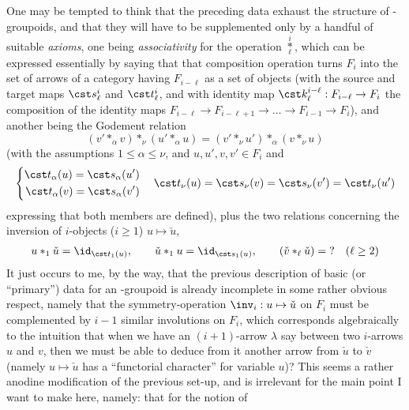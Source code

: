 One may be tempted to think that the preceding data exhaust the
structure of \oo-groupoids, and that they will have to be supplemented
only by a handful of suitable \emph{axioms}, one being
\emph{associativity} for the operation
$\overset{i}{\underset{\ell}{*}}$, which can be expressed essentially
by saying that that composition operation turns $F_i$ into the set of
arrows of a category having $F_{i-\ell}$ as a set of objects (with the
source and target maps $\cst s_\ell^i$ and $\cst t_\ell^i$, and with
identity map $\cst k_\ell^{i-\ell} : F_{i-\ell} \to F_i$ the
composition of the identity maps $F_{i-\ell} \to F_{i-\ell+1} \to
\dots \to F_{i-1} \to F_i$), and another being the Godement relation
\begin{equation*}
  (v' *_\alpha v) *_\nu (u' *_\alpha u) = (v' *_\nu u') *_\alpha (v
  *_\nu u)
\end{equation*}
(with the assumptions $1\le\alpha\le\nu$, and $u,u',v,v' \in F_i$ and
\begin{equation*}
  \left\{\begin{aligned}
      \cst t_\alpha(u)=\cst s_\alpha(u') \\
      \cst t_\alpha(v)=\cst s_\alpha(v') \\
    \end{aligned}\right.\quad
  \cst t_\nu(u) = \cst s_\nu(v) = \cst s_\nu(v') = \cst t_\nu(u')
\end{equation*}
expressing that both members are defined), plus the two relations
concerning the inversion of $i$-objects ($i\ge1$) $u \mapsto \check
u$,
\begin{multline*}
  u *_1 \check u = \id_{\cst t_1(u)} , \qquad \check u *_1 u =
  \id_{\cst s_1(u)} , \qquad
  (\check v *_\ell \check u) = \text{?} \quad(\ell\ge2)
\end{multline*}
It just occurs to me, by the way, that the previous description of
basic (or ``primary'') data for an \oo-groupoid is already incomplete
in some rather obvious respect, namely that the symmetry-operation
$\inv_i : u \mapsto \check u$ on $F_i$ must be complemented by $i-1$
similar involutions on $F_i$, which corresponds algebraically to the
intuition that when we have an $(i+1)$-arrow $\lambda$ say between two
$i$-arrows $u$ and $v$, then we must be able to deduce from it another
arrow from $\check u$ to $\check v$ (namely $u\mapsto\check u$ has a
``functorial character'' for variable $u$)? This seems a rather
anodine modification of the previous set-up, and is irrelevant for the
main point I want to make here, namely: that for the notion of
